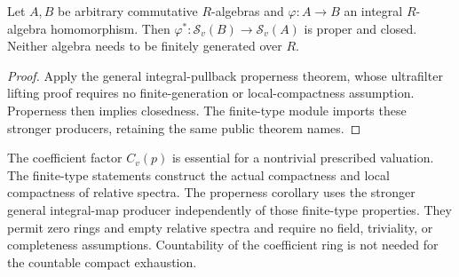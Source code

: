 \begin{corollary}
\label{spectrum:relative-integral-proper-map}
\leanok
{}
Let $A,B$ be arbitrary commutative $R$-algebras and $\varphi:A\to B$ an
integral $R$-algebra homomorphism. Then
$\varphi^*:\mathcal S_v(B)\to\mathcal S_v(A)$ is proper and closed.
Neither algebra needs to be finitely generated over $R$.
\end{corollary}
\begin{proof}
Apply the general integral-pullback properness theorem, whose ultrafilter
lifting proof requires no finite-generation or local-compactness assumption.
Properness then implies closedness. The finite-type module imports these
stronger producers, retaining the same public theorem names.
\end{proof}

\begin{remark}\label{spectrum:relative-finite-type-scope}
The coefficient factor $C_v(p)$ is essential for a nontrivial prescribed
valuation. The finite-type statements construct the actual compactness and local
compactness of relative spectra. The properness corollary uses the stronger
general integral-map producer independently of those finite-type properties. They permit zero rings and empty relative spectra and require
no field, triviality, or completeness assumptions. Countability of the
coefficient ring is not needed for the countable compact exhaustion.
\end{remark}

